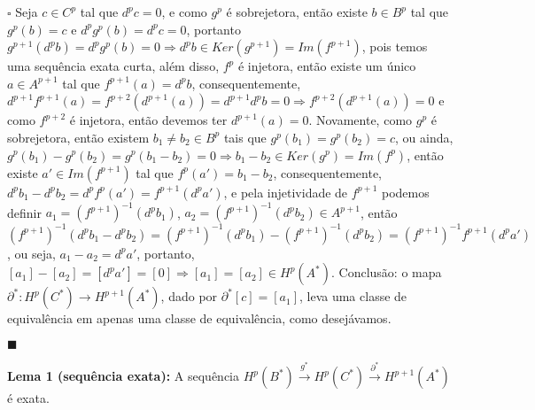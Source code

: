 \documentclass{article}
\begin{document}
	$\square$ Seja $c \in C^{p}$ tal que $d^{p}c=0$, e como $g^{p}$ é sobrejetora, então existe $b \in B^{p}$ tal que $g^{p}(b) = c$ e $d^{p}g^{p}(b) = d^{p}c = 0$, portanto $g^{p+1}(d^{p}b) = d^{p}g^{p}(b) = 0 \Rightarrow d^{p}b \in Ker(g^{p+1}) = Im(f^{p+1})$, pois temos uma sequência exata curta, além disso, $f^{p}$ é injetora, então existe um único $a \in A^{p+1}$ tal que $f^{p+1}(a) = d^{p}b$, consequentemente, $d^{p+1}f^{p+1}(a) = f^{p+2}(d^{p+1}(a))=d^{p+1}d^{p}b=0 \Rightarrow f^{p+2}(d^{p+1}(a)) =0$ e como $f^{p+2}$ é injetora, então devemos ter $d^{p+1}(a)=0$. Novamente, como $g^{p}$ é sobrejetora, então existem $b_{1} \neq b_{2} \in B^{p}$ tais que $g^{p}(b_{1}) = g^{p}(b_{2}) = c$, ou ainda, $g^{p}(b_{1}) - g^{p}(b_{2}) = g^{p}(b_{1}-b_{2}) = 0 \Rightarrow b_{1}-b_{2} \in Ker(g^{p}) = Im(f^{p})$, então existe $a' \in Im(f^{p+1})$ tal que $f^{p}(a') = b_{1}-b_{2}$, consequentemente, $d^{p}b_{1} - d^{p}b_{2} = d^{p}f^{p}(a') = f^{p+1}(d^{p}a')$, e pela injetividade de $f^{p+1}$ podemos definir $a_{1} = (f^{p+1})^{-1}(d^{p}b_{1})$, $ a_{2} = (f^{p+1})^{-1}(d^{p}b_{2}) \in A^{p+1}$, então $(f^{p+1})^{-1}(d^{p}b_{1} - d^{p}b_{2}) =(f^{p+1})^{-1}(d^{p}b_{1}) - (f^{p+1})^{-1}(d^{p}b_{2})  = (f^{p+1})^{-1}f^{p+1}(d^{p}a')$, ou seja, $a_{1} - a_{2} = d^{p}a'$, portanto, $[a_{1}] - [a_{2}] = [d^{p}a'] = [0] \Rightarrow [a_{1}] = [a_{2}] \in H^{p}(A^{*})$. Conclusão: o mapa $\partial^{*}: H^{p}(C^{*}) \to H^{p+1}(A^{*})$, dado por $\partial^{*}[c] = [a_{1}]$, leva uma classe de equivalência em apenas uma classe de equivalência, como desejávamos. 
	
	$\blacksquare$
	
	\vspace{2mm}
	\textbf{Lema 1 (sequência exata):} A sequência $H^{p}(B^{*}) \xrightarrow{g^{*}} H^{p}(C^{*}) \xrightarrow{\partial^{*}} H^{p+1}(A^{*})$ é exata.
	
\end{document}
